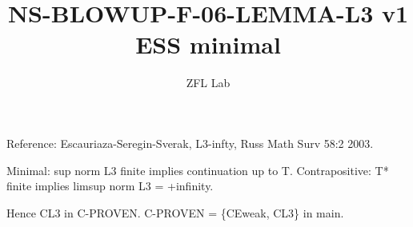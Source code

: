 \documentclass[11pt]{article}
\title{NS-BLOWUP-F-06-LEMMA-L3 v1 ESS minimal}
\author{ZFL Lab}
\begin{document}
\maketitle
Reference: Escauriaza-Seregin-Sverak, L3-infty, Russ Math Surv 58:2 2003.

Minimal: sup norm L3 finite implies continuation up to T.
Contrapositive: T* finite implies limsup norm L3 = +infinity.

Hence CL3 in C-PROVEN.
C-PROVEN = \{CEweak, CL3\} in main.
\end{document}
